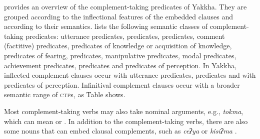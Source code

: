  provides an overview of the complement-taking predicates of Yakkha. They are grouped according to the  inflectional features of the embedded clauses and according to their semantics.  \citet[120]{Noonan2007Complementation} lists the following semantic classes of complement-taking predicates: utterance predicates,  predicates,  predicates, comment (factitive) predicates, predicates of knowledge or acquisition of knowledge, predicates of fearing,  predicates, manipulative predicates, modal predicates, achievement predicates,  predicates and predicates of perception. In Yakkha, inflected complement clauses occur with utterance predicates,  predicates and  with predicates of perception. Infinitival  complement clauses occur with a broader semantic range of \textsc{ctp}s, as Table  shows. 

Most complement-taking verbs may also take nominal arguments, e.g., \emph{tokma}, which can mean  or . In addition to the complement-taking verbs, there are also some nouns that can embed clausal complements, such as \emph{ceʔya}  or \emph{kisiʔma} . 


